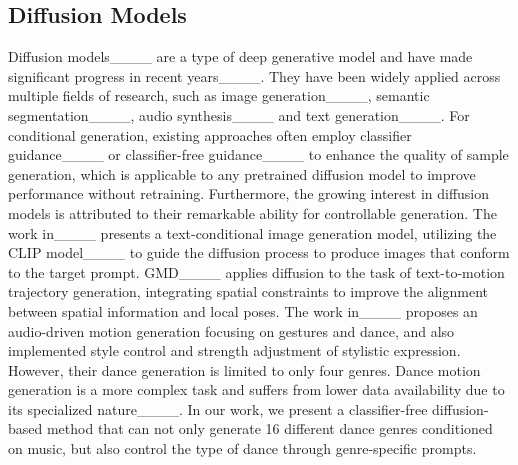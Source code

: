 \subsection{Diffusion Models}
Diffusion models____ are a type of deep generative model and have made significant progress in recent years____.
They have been widely applied across multiple fields of research, such as image generation____, semantic segmentation____, audio synthesis____
and text generation____. For conditional generation, existing approaches often employ classifier guidance____ or classifier-free guidance____ to enhance the quality of sample generation, which is applicable to any pretrained diffusion model to improve performance without retraining. Furthermore, the growing interest in diffusion models is attributed to their remarkable ability for controllable generation. The work in____ presents a text-conditional image generation model, utilizing the CLIP model____ to guide the diffusion process to produce images that conform to the target prompt. GMD____ applies diffusion to the task of text-to-motion trajectory generation, integrating spatial constraints to improve the alignment between spatial information and local poses. The work in____ proposes an audio-driven motion generation focusing on gestures and dance, and also implemented style control and strength adjustment of stylistic expression. However, their dance generation is limited to only four genres. Dance motion generation is a more complex task and suffers from lower data availability due to its specialized nature____. In our work, we present a classifier-free diffusion-based method that can not only generate 16 different dance genres conditioned on music, but also control the type of dance through genre-specific prompts.




